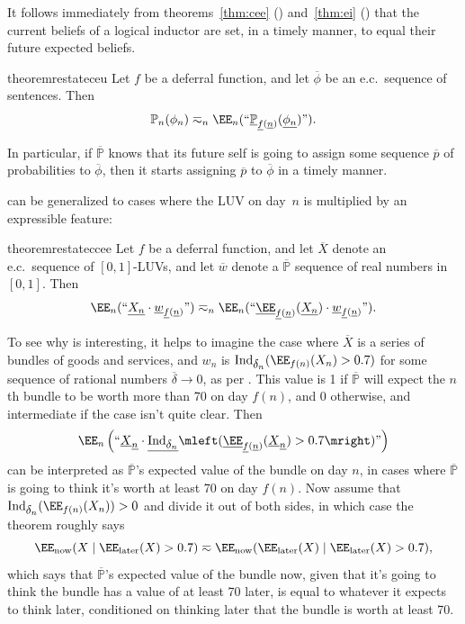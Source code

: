\documentclass[authordate,onecolumn,noenvironments]{miri-tech-article}
\numberwithin{equation}{subsection}
\newcommand{\quot}[1]{``#1"}
\newcommand{\enc}[1]{{\underline{#1}}}
\newcommand{\seq}[1]{{\overline{#1}}}
\newcommand{\prob}{p}
\newcommand{\nn}{n}
\newcommand{\deff}{f}
\newcommand{\phis}{\seq{\phi}}
\newcommand{\deltas}{\seq{\delta}}
\newcommand{\probs}{\seq{{\prob}}}
\newcommand{\ec}[1][\ ]{e.c.#1}
\newcommand{\pgenable}{\ensuremath{\MP}\text{-generable}\xspace}
\newcommand{\rparenthetical}[1]{\hfill\upshape{{\small (#1)}}} %
\newcommand{\proofin}[1]{\rparenthetical{Proof in:~#1.}}
\newcommand{\BelState}{\mathbb{P}}
\newcommand{\pt}{\BelState}
\newcommand{\MP}{\seq{\pt}}
\newcommand{\ctsind}[1]{\operatorname{Ind}_{\text{\small{${#1}$}}}} %
\begin{document}
It follows immediately from theorems~\ref{thm:cee} () and~\ref{thm:ei} () that the current beliefs of a logical inductor are set, in a timely manner, to equal their future expected beliefs.
\begin{restatable}{theorem}{restateceu}\label{thm:ceu}
  Let $\deff$ be a deferral function, and let $\phis$ be an \ec sequence of sentences. Then
  \[
      \pt_\nn(\phi_\nn) \eqsim_\nn 
      \EE_\nn(\quot{\enc{\pt}_{\enc{\deff}(\enc{\nn})}(\enc{\phi_\nn})}).
  \]
  \proofin{\ref{app:ceu}}
\end{restatable}
\noindent In particular, if $\MP$ knows that its future self is going to assign some sequence $\probs$ of probabilities to $\phis$, then it starts assigning $\probs$ to $\phis$ in a timely manner.

 can be generalized to cases where the LUV on day~$\nn$ is multiplied by an expressible feature:

\begin{restatable}{theorem}{restateccee}\label{thm:ccee}
  Let $\deff$ be a deferral function, and let $\seq{X}$ denote an \ec sequence of $[0,1]$-LUVs, and let $\seq w$ denote a \pgenable sequence of real numbers in $[0, 1]$.  Then
  \[
  \EE_\nn(\quot{\enc{X_\nn} \cdot \enc{w}_{\enc{\deff}(\enc{\nn})}}) \eqsim_\nn
  \EE_\nn(\quot{\enc{\EE}_{\enc{\deff}(\enc{\nn})}(\enc{X_\nn}) \cdot \enc{w}_{\enc{\deff}(\enc{\nn})}}).
  \]
  \proofin{\ref{app:ccee}}
\end{restatable}

\noindent To see why  is interesting, it helps to imagine the case where $\seq{X}$ is a series of bundles of goods and services, and $w_\nn$ is $\ctsind{\delta_\nn}(\EE_{\deff(\nn)}(X_\nn) > 0.7)$ for some sequence of rational numbers $\deltas \to 0$, as per . This value is 1 if $\MP$ will expect the $\nn$th bundle to be worth more than 70\textcent{} on day $\deff(\nn)$, and 0 otherwise, and intermediate if the case isn't quite clear. Then
\[
  \EE_\nn\left(\quot{\enc{X}_\enc{\nn} \cdot
    \enc{\ctsind{\delta_\nn}}\mleft(
      \enc{\EE}_{\enc{f}(\enc{\nn})}(\enc{X}_\enc{\nn}) > 0.7
    \mright)}
  \right)
\]
can be interpreted as $\MP$'s expected value of the bundle on day $\nn$, in cases where $\MP$ is going to think it's worth at least 70\textcent{} on day $f(\nn)$. Now assume that $\ctsind{\delta_\nn}(\EE_{f(\nn)}(X_\nn)) > 0$ and divide it out of both sides, in which case the theorem roughly says
\[
  \EE_\mathrm{now}(X \mid \EE_\mathrm{later}(X) > 0.7) \eqsim \EE_\mathrm{now}(\EE_\mathrm{later}(X) \mid \EE_\mathrm{later}(X) > 0.7),
\]
which says that $\MP$'s expected value of the bundle now, given that it's going to think the bundle has a value of at least 70\textcent{} later, is equal to whatever it expects to think later, conditioned on thinking later that the bundle is worth at least 70\textcent{}.
\end{document}
